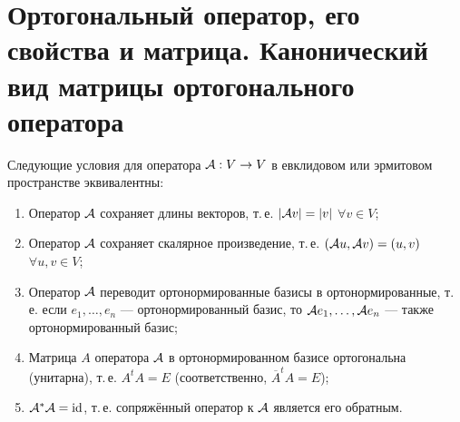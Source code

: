 \section{Ортогональный оператор, его свойства и матрица. Канонический вид матрицы ортогонального оператора}

\begin{proposal}
    Следующие условия для оператора $\mathcal{A}: V \to V$ в евклидовом или эрмитовом пространстве эквивалентны:
    \begin{enumerate}[nolistsep]
        \item Оператор $\mathcal{A}$ сохраняет длины векторов, т.\,е. $\left\lvert\mathcal{A} v\right\rvert = \left\lvert v\right\rvert$ $\forall v \in V$;
        \item Оператор $\mathcal{A}$ сохраняет скалярное произведение, т.\,е. $(\mathcal{A} u, \mathcal{A} v) = (u, v)$ $\forall u, v \in V$;
        \item Оператор $\mathcal{A}$ переводит ортонормированные базисы в ортонормированные, т.\,е. если $e_1, \ldots, e_n$ --- ортонормированный базис, то $\mathcal{A} e_1, \ldots, \mathcal{A} e_n$ --- также ортонормированный базис;
        \item Матрица $A$ оператора $\mathcal{A}$ в ортонормированном базисе ортогональна (унитарна), т.\,е. $A^tA = E$ (соответственно, $\overline{A}^tA = E$);
        \item $\mathcal{A}^\ast\mathcal{A} = \mathrm{id}$, т.\,е. сопряжённый оператор к $\mathcal{A}$ является его обратным.
    \end{enumerate}
\end{proposal}

